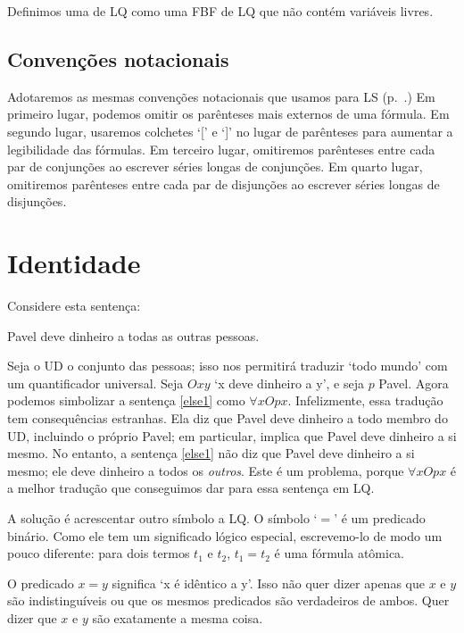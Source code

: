 Definimos uma  de LQ como uma FBF de LQ que não contém variáveis livres.



\subsection{Convenções notacionais}

Adotaremos as mesmas convenções notacionais que usamos para LS (p.~\pageref{LSconventions}.) Em primeiro lugar, podemos omitir os parênteses mais externos de uma fórmula. Em segundo lugar, usaremos colchetes `[' e `]' no lugar de parênteses para aumentar a legibilidade das fórmulas. Em terceiro lugar, omitiremos parênteses entre cada par de conjunções ao escrever séries longas de conjunções. Em quarto lugar, omitiremos parênteses entre cada par de disjunções ao escrever séries longas de disjunções.

\section{Identidade}
\label{sec.identity}

Considere esta sentença:
\begin{earg}
\item[\ex{else1}] Pavel deve dinheiro a todas as outras pessoas.
\end{earg}
Seja o UD o conjunto das pessoas; isso nos permitirá traduzir `todo mundo' com um quantificador universal. Seja $Oxy$ `x deve dinheiro a y', e seja $p$ Pavel. Agora podemos simbolizar a sentença \ref{else1} como $\forall x Opx$. Infelizmente, essa tradução tem consequências estranhas. Ela diz que Pavel deve dinheiro a todo membro do UD, incluindo o próprio Pavel; em particular, implica que Pavel deve dinheiro a si mesmo. No entanto, a sentença \ref{else1} não diz que Pavel deve dinheiro a si mesmo; ele deve dinheiro a todos os \emph{outros}. Este é um problema, porque $\forall x Opx$ é a melhor tradução que conseguimos dar para essa sentença em LQ.

A solução é acrescentar outro símbolo a LQ. O símbolo `$=$' é um predicado binário. Como ele tem um significado lógico especial, escrevemo-lo de modo um pouco diferente: para dois termos $t_1$ e $t_2$, $t_1=t_2$ é uma fórmula atômica.

O predicado $x=y$ significa `x é idêntico a y'. Isso não quer dizer apenas que $x$ e $y$ são indistinguíveis ou que os mesmos predicados são verdadeiros de ambos. Quer dizer que $x$ e $y$ são exatamente a mesma coisa.

